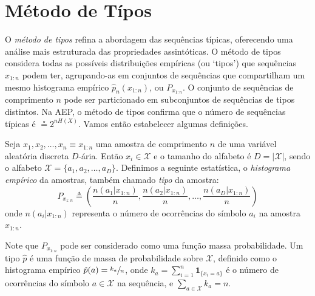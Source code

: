 










\section{Método de Típos}

O \emph{método de tipos} refina a abordagem das sequências típicas, oferecendo uma
análise mais estruturada das propriedades assintóticas. O método de tipos
considera todas as possíveis distribuições empíricas (ou `tipos') que
sequências $x_{1:n}$ podem ter, agrupando-as em conjuntos de sequências que
compartilham um mesmo histograma empírico $\hat{p}_n(x_{1:n})$, ou
$P_{x_{1:n}}$. O conjunto de sequências de comprimento $n$ pode ser
particionado em subconjuntos de sequências de tipos distintos. Na AEP, o método
de tipos confirma que o número de sequências típicas é $\circeq 2^{nH(X)}$.
Vamos então estabelecer algumas definições.

\begin{definition}
  Seja $x_1, x_2, \ldots, x_n \equiv x_{1:n}$ uma amostra de comprimento $n$ de uma variável aleatória discreta $D$-ária.
  Então $x_i \in \mathcal{X}$ e o tamanho do alfabeto é $D=\vert \mathcal{X} \vert$, sendo o alfabeto $\mathcal{X}=\{a_1, a_2, \ldots, a_D\}$.
  Definimos a seguinte estatística, o \emph{histograma empírico} da amostras, também chamado \emph{tipo} da amostra:
  \begin{equation}
  P_{x_{1:n}} \triangleq \left( \frac{n(a_1|x_{1:n})}{n}, \frac{n(a_2|x_{1:n})}{n}, \ldots, \frac{n(a_D|x_{1:n})}{n} \right)
  \end{equation}
  onde $n(a_i|x_{1:n})$ representa o número de ocorrências do símbolo $a_i$ na amostra $x_{1:n}$.
\end{definition}
Note que $P_{x_{1:n}}$ pode ser considerado como uma função massa probabilidade.
Um tipo $\hat{p}$ é uma função de massa de probabilidade sobre $\mathcal{X}$, 
definido como o histograma empírico $\hat{p}(a) = \sfrac{k_a}{n}$, 
onde $k_a = \sum_{i=1}^n \mathbf{1}_{\{x_i = a\}}$ é o número de ocorrências do símbolo $a \in \mathcal{X}$ na sequência, 
e $\sum_{a \in \mathcal{X}} k_a = n$.

